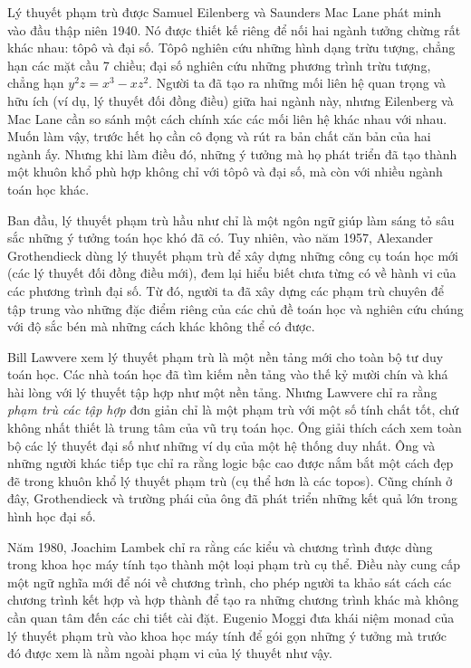 Lý thuyết phạm trù được Samuel Eilenberg và Saunders Mac Lane phát minh vào đầu thập niên 1940. Nó được thiết kế riêng để nối hai ngành tưởng chừng rất khác nhau: tôpô và đại số. Tôpô nghiên cứu những hình dạng trừu tượng, chẳng hạn các mặt cầu 7 chiều; đại số nghiên cứu những phương trình trừu tượng, chẳng hạn $y^2z=x^3-xz^2$. Người ta đã tạo ra những mối liên hệ quan trọng và hữu ích (ví dụ, lý thuyết đối đồng điều) giữa hai ngành này, nhưng Eilenberg và Mac Lane cần so sánh một cách chính xác các mối liên hệ khác nhau với nhau. Muốn làm vậy, trước hết họ cần cô đọng và rút ra bản chất căn bản của hai ngành ấy. Nhưng khi làm điều đó, những ý tưởng mà họ phát triển đã tạo thành một khuôn khổ phù hợp không chỉ với tôpô và đại số, mà còn với nhiều ngành toán học khác.

Ban đầu, lý thuyết phạm trù hầu như chỉ là một ngôn ngữ giúp làm sáng tỏ sâu sắc những ý tưởng toán học khó đã có. Tuy nhiên, vào năm 1957, Alexander Grothendieck dùng lý thuyết phạm trù để xây dựng những công cụ toán học mới (các lý thuyết đối đồng điều mới), đem lại hiểu biết chưa từng có về hành vi của các phương trình đại số. Từ đó, người ta đã xây dựng các phạm trù chuyên để tập trung vào những đặc điểm riêng của các chủ đề toán học và nghiên cứu chúng với độ sắc bén mà những cách khác không thể có được.

Bill Lawvere xem lý thuyết phạm trù là một nền tảng mới cho toàn bộ tư duy toán học. Các nhà toán học đã tìm kiếm nền tảng vào thế kỷ mười chín và khá hài lòng với lý thuyết tập hợp như một nền tảng. Nhưng Lawvere chỉ ra rằng \emph{phạm trù các tập hợp} đơn giản chỉ là một phạm trù với một số tính chất tốt, chứ không nhất thiết là
trung tâm của vũ trụ toán học. Ông giải thích cách xem toàn bộ các lý thuyết đại số như những ví dụ của một hệ thống duy nhất. Ông và những người khác tiếp tục chỉ ra rằng logic bậc cao được nắm bắt một cách đẹp đẽ trong khuôn khổ lý thuyết phạm trù (cụ thể hơn là các topos). Cũng chính ở đây, Grothendieck và trường phái của ông đã phát triển những kết quả lớn trong hình học đại số.

Năm 1980, Joachim Lambek chỉ ra rằng các kiểu và chương trình được dùng trong khoa học máy tính tạo thành một loại phạm trù cụ thể. Điều này cung cấp một ngữ nghĩa mới để nói về chương trình, cho phép người ta khảo sát cách các chương trình kết hợp và hợp thành để tạo ra những chương trình khác mà không cần quan tâm đến các chi tiết cài đặt. Eugenio Moggi đưa khái niệm monad của lý thuyết phạm trù vào khoa học máy tính để gói gọn những ý tưởng mà trước đó được xem là nằm ngoài phạm vi của lý thuyết như vậy.

